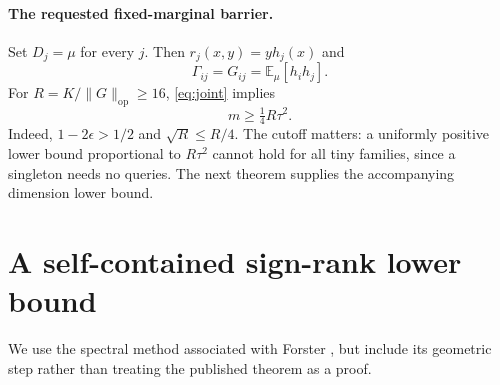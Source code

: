 \documentclass[11pt]{article}
\newcommand{\E}{\mathbb E}
\newcommand{\1}{\mathbf 1}
\newcommand{\op}{\mathrm{op}}
\begin{document}
\paragraph{The requested fixed-marginal barrier.}
Set $D_j=\mu$ for every $j$. Then $r_j(x,y)=y h_j(x)$ and
\[
 \Gamma_{ij}=G_{ij}=\E_\mu[h_i h_j].
\]
For $R=K/\|G\|_\op\geq16$, \eqref{eq:joint} implies
\begin{equation}\label{eq:fixed}
 m\geq\tfrac14 R\tau^2.
\end{equation}
Indeed, $1-2\epsilon>1/2$ and $\sqrt R\leq R/4$. The cutoff matters: a uniformly positive lower bound proportional to $R\tau^2$ cannot hold for all tiny families, since a singleton needs no queries. The next theorem supplies the accompanying dimension lower bound.

\section{A self-contained sign-rank lower bound}
We use the spectral method associated with Forster \citep{Forster02}, but include its geometric step rather than treating the published theorem as a proof.
\end{document}
